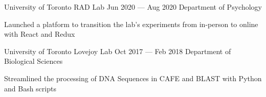 \begin{cventries}
  \cventry
    {University of Toronto}
    {RAD Lab}
    {}
    {Jun 2020 --- Aug 2020}
    {Department of Psychology}
    {
      \begin{cvitems}
        \item {Launched a platform to transition the lab's experiments from in-person to online with React and Redux}
      \end{cvitems}
    }
  \cventry
    {University of Toronto}
    {Lovejoy Lab}
    {}
    {Oct 2017 --- Feb 2018}
    {Department of Biological Sciences}
    {
      \begin{cvitems}
        \item {Streamlined the processing of DNA Sequences in CAFE and BLAST with Python and Bash scripts}
      \end{cvitems}
    }
\end{cventries}